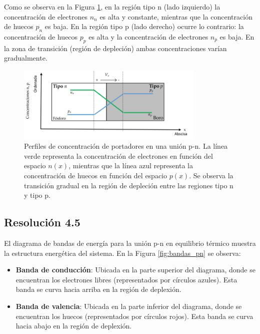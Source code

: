 \documentclass[
  11pt,
  letterpaper,
   addpoints,
   answers
  ]{exam}
\begin{document}
\begin{questions}
\begin{solution}
    Como se observa en la Figura \ref{fig:concentraciones_pn}, en la región tipo n (lado izquierdo) la concentración de electrones $n_n$ es alta y constante, mientras que la concentración de huecos $p_n$ es baja. En la región tipo p (lado derecho) ocurre lo contrario: la concentración de huecos $p_p$ es alta y la concentración de electrones $n_p$ es baja. En la zona de transición (región de depleción) ambas concentraciones varían gradualmente.

    \begin{figure}[H]
        \centering
        \includegraphics[width=0.8\textwidth]{../figures/Auxiliar_2_9}
        \caption{Perfiles de concentración de portadores en una unión p-n. La línea verde representa la concentración de electrones en función del espacio $n(x)$, mientras que la línea azul representa la concentración de huecos en función del espacio $p(x)$. Se observa la transición gradual en la región de depleción entre las regiones tipo n y tipo p.}
        \label{fig:concentraciones_pn}
    \end{figure}

    \subsection*{Resolución 4.5}
    
    El diagrama de bandas de energía para la unión p-n en equilibrio térmico muestra la estructura energética del sistema. En la Figura \ref{fig:bandas_pn} se observa:

    \begin{itemize}
        \item \textbf{Banda de conducción}: Ubicada en la parte superior del diagrama, donde se encuentran los electrones libres (representados por círculos azules). Esta banda se curva hacia arriba en la región de deplexión.
        
        \item \textbf{Banda de valencia}: Ubicada en la parte inferior del diagrama, donde se encuentran los huecos (representados por círculos rojos). Esta banda se curva hacia abajo en la región de deplexión.
        

\end{itemize}
\end{solution}
\end{questions}
\end{document}
